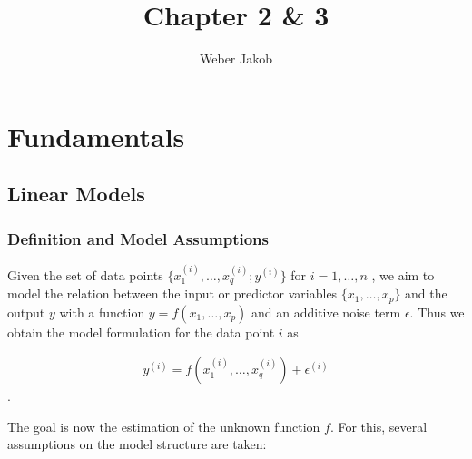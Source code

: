 \documentclass[10pt,a4paper]{report}
\title{Chapter 2 \& 3}
\author{Weber Jakob}
\begin{document}
\maketitle

\tableofcontents
\chapter{Fundamentals}

\section{Linear Models} \label{sec:LinModel}
	
\subsection{Definition and Model Assumptions}  \label{subsec:LinModelDefAndAssump}

Given the set of data points $\{x^{(i)}_1, \dots, x^{(i)}_q; y^{(i)} \}$ for $i = 1, \dots, n$ , we aim to model the relation between the input or predictor variables $\{x_1, \dots, x_p\}$ and the output $y$ with a function $y = f(x_1, \dots, x_p)$ and an additive noise term $\epsilon$. Thus we obtain the model formulation for the data point $i$ as

\begin{align} \label{eq:lin_mod_single_data_point}
	y^{(i)} = f(x^{(i)}_{1}, \dots, x^{(i)}_{q}) + \epsilon^{(i)}
\end{align}.

The goal is now the estimation of the unknown function $f$. For this, several assumptions on the model structure are taken:
\end{document}
